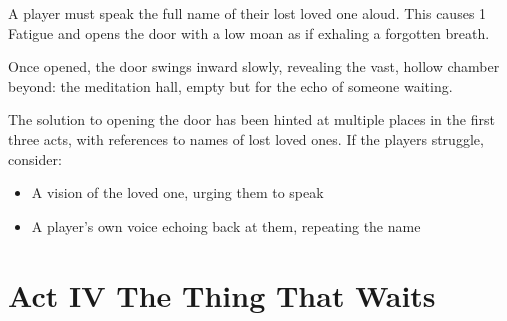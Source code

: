 \documentclass[twocolumn,nodeprecatedcode,bg=print]{dndbook/dndbook}
\begin{document}
\begin{WyrdExample}
    A player must speak the full name of their lost loved one aloud. This causes 1 Fatigue and opens the door with a low moan as if exhaling a forgotten breath.
\end{WyrdExample}

Once opened, the door swings inward slowly, revealing the vast, hollow chamber beyond: the meditation hall, empty but for the echo of someone waiting.

\begin{WyrdGmTips}
    The solution to opening the door has been hinted at multiple places in the first three acts, with references to names of lost loved ones. If the players struggle, consider:
    \begin{itemize}
        \item A vision of the loved one, urging them to speak
        \item A player’s own voice echoing back at them, repeating the name
    \end{itemize}
\end{WyrdGmTips}




\section*{Act IV \textendash{} The Thing That Waits}
\end{document}
